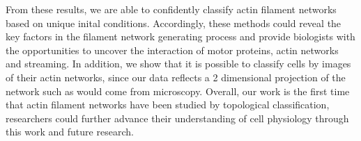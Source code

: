 \documentclass[10pt]{article}
\begin{document}
From these results, we are able to confidently classify actin filament networks based on unique inital conditions. Accordingly, these methods could reveal the key factors in the filament network generating process and provide biologists with the opportunities to uncover the interaction of motor proteins, actin networks and streaming. In addition, we show that it is possible to classify cells by images of their actin networks, since our data reflects a 2 dimensional projection of the network such as would come from microscopy. Overall, our work is the first time that actin filament networks have been studied by topological classification, researchers could further advance their understanding of cell physiology through this work and future research. 

\clearpage	


\end{document}
